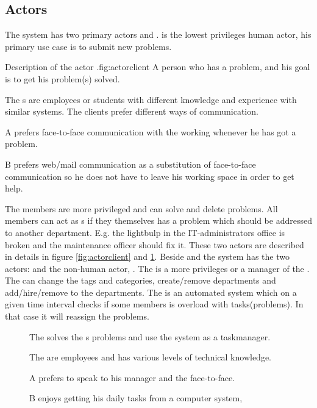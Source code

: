 \subsection{Actors}
\label{sec:actors}


The system has two primary actors \aclient{} and \astaff. \aclient[c] is the lowest privileges human actor, his primary use case is to submit new problems. \\

\begin{sadlist}[h]{\Aclient}{Description of the actor \aclient.}{fig:actorclient}
 A person who has a problem, and his goal is to get his problem(s) solved.

 The \aclient{}s are employees or students with different knowledge and experience with similar systems. The clients prefer different ways of communication.%

 \Aclient{} A prefers face-to-face communication with the working \astaff{} whenever he has got a problem. 

\aclient[c] B prefers web/mail communication as a substitution of face-to-face communication so he does not have to leave his working space in order to get help. 

\end{sadlist}


The \astaff{} members are more privileged and can solve and delete problems. 
All \astaff{} members can act as \aclient{}s if they themselves has a problem which should be addressed to another department. 
E.g. the lightbulp in the IT-administrators office is broken and the maintenance officer should fix it. 
These two actors are described in details in figure \ref{fig:actorclient} and \ref{fig:actorstaff}. 
Beside \astaff{} and \aclient{} the system has the two actors: \sadmin{} and the non-human actor, \wmon. 
The \sadmin{} is a more privileges \astaff{} or a manager of the \astaff. \\

The \sadmin{} can change the tags and categories, create/remove departments and add/hire/remove \astaff{} to the departments. 
The \wmon[] is an automated system which on a given time interval checks if some \astaff{} members is overload with tasks(problems). 
In that case it will reassign the problems.




\begin{figure}[h]

\begin{sadlistar}{\Astaff}

 The \astaff{} solves the \aclient[]s problems and use the system as a taskmanager.  

 The \astaff[] are employees and has various levels of technical knowledge.

 \astaff[c] A prefers to speak to his manager and the \aclient[] face-to-face.

\astaff[c] B enjoys getting his daily tasks from a computer system, 
 \end{sadlistar}
 \caption{}
 \label{fig:actorstaff}
 \end{figure}